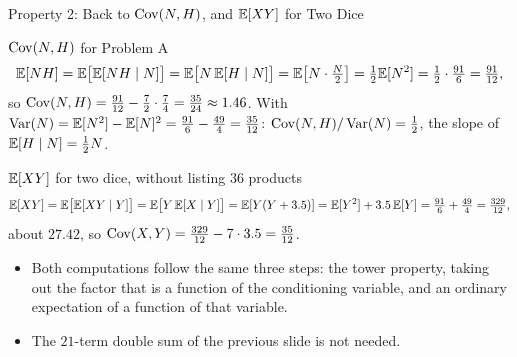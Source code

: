 \begin{frame}{Property 2: Back to $\operatorname{Cov}(N,H)$, and $\mathbb{E}[XY]$ for Two Dice}
  \small
  \begin{exampleblock}{$\operatorname{Cov}(N,H)$ for Problem A}
    \[
      \mathbb{E}[NH]=\mathbb{E}\big[\mathbb{E}[NH\mid N]\big]=\mathbb{E}\big[N\,\mathbb{E}[H\mid N]\big]=\mathbb{E}\big[N\cdot\tfrac N2\big]=\tfrac12\mathbb{E}[N^2]=\tfrac12\cdot\tfrac{91}6=\tfrac{91}{12},
    \]
    so $\operatorname{Cov}(N,H)=\tfrac{91}{12}-\tfrac72\cdot\tfrac74=\tfrac{35}{24}\approx1.46$.
    With $\operatorname{Var}(N)=\mathbb{E}[N^2]-\mathbb{E}[N]^2=\tfrac{91}6-\tfrac{49}4=\tfrac{35}{12}$: $\operatorname{Cov}(N,H)/\operatorname{Var}(N)=\tfrac12$, the slope of $\mathbb{E}[H\mid N]=\tfrac12N$.
  \end{exampleblock}
  \begin{exampleblock}{$\mathbb{E}[XY]$ for two dice, without listing $36$ products}
    \[
      \mathbb{E}[XY]=\mathbb{E}\big[\mathbb{E}[XY\mid Y]\big]=\mathbb{E}\big[Y\,\mathbb{E}[X\mid Y]\big]=\mathbb{E}[Y(Y+3.5)]=\mathbb{E}[Y^2]+3.5\,\mathbb{E}[Y]=\tfrac{91}{6}+\tfrac{49}{4}=\tfrac{329}{12},
    \]
    about $27.42$, so $\operatorname{Cov}(X,Y)=\tfrac{329}{12}-7\cdot3.5=\tfrac{35}{12}$.
  \end{exampleblock}
  \begin{itemize}
    \item Both computations follow the same three steps: the tower property, taking out the factor that is a function of the conditioning variable, and an ordinary expectation of a function of that variable.
    \item The $21$-term double sum of the previous slide is not needed.
  \end{itemize}
\end{frame}

